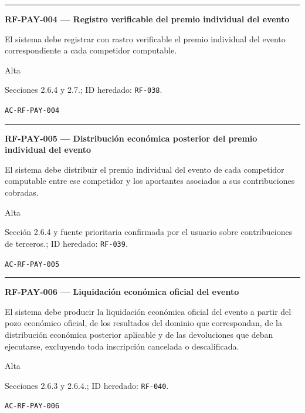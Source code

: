 \documentclass[10pt,letterpaper]{article}
\begin{document}
\vspace{0.25em}\hrule\vspace{0.65em}
\noindent\textbf{RF-PAY-004 --- Registro verificable del premio individual del evento}\par
\begin{description}[style=nextline,leftmargin=3.15cm,labelwidth=2.8cm,font=\normalfont\bfseries]
\item[Obligación] El sistema debe registrar con rastro verificable el premio individual del evento correspondiente a cada competidor computable.
\item[Prioridad] Alta
\item[Procedencia] Secciones 2.6.4 y 2.7.; ID heredado: \texttt{RF-038}.
\item[Verificación] \texttt{AC-RF-PAY-004}
\end{description}
\vspace{0.25em}\hrule\vspace{0.65em}
\noindent\textbf{RF-PAY-005 --- Distribución económica posterior del premio individual del evento}\par
\begin{description}[style=nextline,leftmargin=3.15cm,labelwidth=2.8cm,font=\normalfont\bfseries]
\item[Obligación] El sistema debe distribuir el premio individual del evento de cada competidor computable entre ese competidor y los aportantes asociados a sus contribuciones cobradas.
\item[Prioridad] Alta
\item[Procedencia] Sección 2.6.4 y fuente prioritaria confirmada por el usuario sobre contribuciones de terceros.; ID heredado: \texttt{RF-039}.
\item[Verificación] \texttt{AC-RF-PAY-005}
\end{description}
\vspace{0.25em}\hrule\vspace{0.65em}
\noindent\textbf{RF-PAY-006 --- Liquidación económica oficial del evento}\par
\begin{description}[style=nextline,leftmargin=3.15cm,labelwidth=2.8cm,font=\normalfont\bfseries]
\item[Obligación] El sistema debe producir la liquidación económica oficial del evento a partir del pozo económico oficial, de los resultados del dominio que correspondan, de la distribución económica posterior aplicable y de las devoluciones que deban ejecutarse, excluyendo toda inscripción cancelada o descalificada.
\item[Prioridad] Alta
\item[Procedencia] Secciones 2.6.3 y 2.6.4.; ID heredado: \texttt{RF-040}.
\item[Verificación] \texttt{AC-RF-PAY-006}
\end{description}
\end{document}

